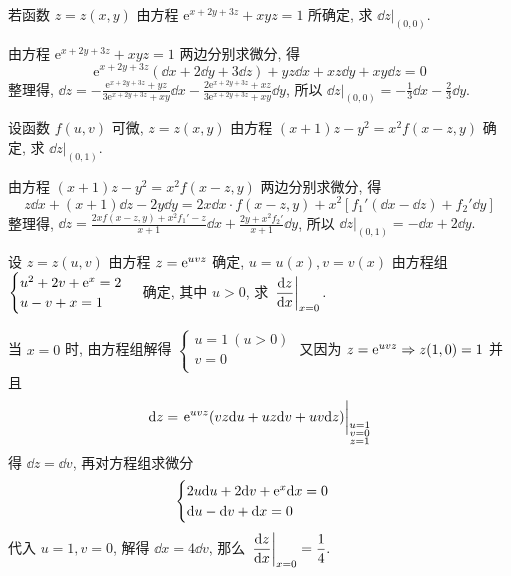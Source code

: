 \begin{example}[2015 数二]
    若函数 $z=z(x,y)$ 由方程 $\mathrm{e}^{x+2y+3z}+xyz=1$ 所确定, 求 $\dd z|_{(0,0)}.$
\end{example}
\begin{solution}
    由方程 $\mathrm{e}^{x+2y+3z}+xyz=1$ 两边分别求微分, 得
    $$\mathrm{e}^{x+2y+3z}(\dd x+2\dd y+3\dd z)+yz\dd x+xz\dd y+xy\dd z=0$$
    整理得, $\displaystyle\dd z=-\frac{\mathrm{e}^{x+2y+3z}+yz}{3\mathrm{e}^{x+2y+3z}+xy}\dd x-\frac{2\mathrm{e}^{x+2y+3z}+xz}{3\mathrm{e}^{x+2y+3z}+xy}\dd y$, 所以 $\displaystyle\dd z|_{(0,0)}=-\frac{1}{3}\dd x-\frac{2}{3}\dd y$.
\end{solution}

\begin{example}[2016 数一]
    设函数 $f(u,v)$ 可微, $z=z(x,y)$ 由方程 $(x+1)z-y^2=x^2f(x-z,y)$ 确定, 求 $\dd z|_{(0,1)}.$
\end{example}
\begin{solution}
    由方程 $(x+1)z-y^2=x^2f(x-z,y)$ 两边分别求微分, 得
    $$z\dd x+(x+1)\dd z-2y\dd y=2x\dd x\cdot f(x-z,y)+x^2\left[f_1'(\dd x-\dd z)+f_2'\dd y\right]$$
    整理得, $\displaystyle\dd z=\frac{2xf(x-z,y)+x^2f_1'-z}{x+1}\dd x+\frac{2y+x^2f_2'}{x+1}\dd y$, 所以 $\displaystyle\dd z|_{(0,1)}=-\dd x+2\dd y.$
\end{solution}

\begin{example}
    设 $z=z(u,v)$ 由方程 $z=\mathrm{e} ^{uvz}$ 确定, $u=u(x), v=v(x)$ 由方程组 $\begin{cases}
            u^2+2v+\mathrm{e} ^{x}=2 \\
            u-v+x=1
        \end{cases}$ 确定, 其中 $u>0$, 求 $\displaystyle \eval{\dv{z}{x}}_{x=0}.$
\end{example}
\begin{solution}
    当 $x=0$ 时, 由方程组解得 $\begin{cases}
            u=1~(u>0) \\ v=0\\
        \end{cases}$ 又因为 $z=\mathrm{e} ^{uvz}\Rightarrow z(1,0)=1$ 并且 $$
        \dd z=\eval{\e ^{uvz}(vz\dd u+uz\dd v+uv\dd z)}_{\substack{u=1\\ v=0\\ z=1}}
    $$
    得 $\dd z=\dd v$, 再对方程组求微分
    $$
        \begin{cases}
            2u\dd u+2\dd v+\mathrm{e} ^{x}\dd x=0 \\
            \dd u-\dd v+\dd x=0
        \end{cases}
    $$
    代入 $u=1, v=0$, 解得 $\dd x=4\dd v$, 那么 $\displaystyle \eval{\dv{z}{x}}_{x=0}=\dfrac{1}{4}.$
\end{solution}

